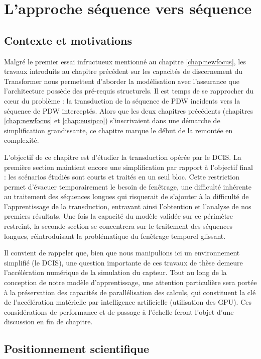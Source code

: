 \chapter{L'approche séquence vers séquence}
\label{chap:seq2seq}

\section{Contexte et motivations}
Malgré le premier essai infructueux mentionné au chapitre \ref{chap:newfocus}, les travaux introduits au chapitre précédent sur les capacités de discernement du Transformer nous permettent d'aborder la modélisation avec l'assurance que l'architecture possède des pré-requis structurels. Il est temps de se rapprocher du cœur du problème : la transduction de la séquence de PDW incidents vers la séquence de PDW interceptés. Alors que les deux chapitres précédents (chapitres \ref{chap:newfocus} et \ref{chap:eusipco}) s'inscrivaient dans une démarche de simplification grandissante, ce chapitre marque le début de la remontée en complexité.

L'objectif de ce chapitre est d'étudier la transduction opérée par le DCIS. La première section maintient encore une simplification par rapport à l'objectif final : les scénarios étudiés sont courts et traités en un seul bloc. Cette restriction permet d'évacuer temporairement le besoin de fenêtrage, une difficulté inhérente au traitement des séquences longues qui risquerait de s'ajouter à la difficulté de l'apprentissage de la transduction, entravant ainsi l'obtention et l'analyse de nos premiers résultats. Une fois la capacité du modèle validée sur ce périmètre restreint, la seconde section se concentrera sur le traitement des séquences longues, réintroduisant la problématique du fenêtrage temporel glissant.

Il convient de rappeler que, bien que nous manipulions ici un environnement simplifié (le DCIS), une question importante de ces travaux de thèse demeure l'accélération numérique de la simulation du capteur. Tout au long de la conception de notre modèle d'apprentissage, une attention particulière sera portée à la préservation des capacités de parallélisation des calculs, qui constituent la clé de l'accélération matérielle par intelligence artificielle (utilisation des GPU). Ces considérations de performance et de passage à l'échelle feront l'objet d'une discussion en fin de chapitre.

\section{Positionnement scientifique}
\label{seq:posscie}

